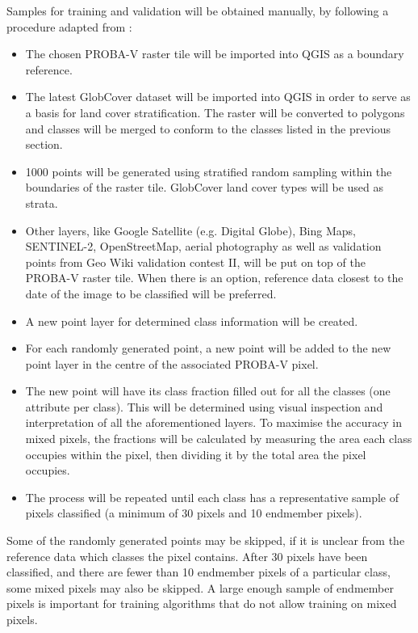 \documentclass[a4paper,10pt]{article}
\begin{document}
Samples for training and validation will be obtained manually, by following a procedure adapted from \cite{defries1998training}:
\begin{itemize}
 \item The chosen PROBA-V raster tile will be imported into QGIS as a boundary reference.
 \item The latest GlobCover dataset will be imported into QGIS in order to serve as a basis for land cover stratification. The raster will be converted to polygons and classes will be merged to conform to the classes listed in the previous section.
 \item 1000 points will be generated using stratified random sampling within the boundaries of the raster tile. GlobCover land cover types will be used as strata.
 \item Other layers, like Google Satellite (e.g. Digital Globe), Bing Maps, SENTINEL-2, OpenStreetMap, aerial photography as well as validation points from Geo Wiki validation contest II, will be put on top of the PROBA-V raster tile. When there is an option, reference data closest to the date of the image to be classified will be preferred.
 \item A new point layer for determined class information will be created.
 \item For each randomly generated point, a new point will be added to the new point layer in the centre of the associated PROBA-V pixel.
 \item The new point will have its class fraction filled out for all the classes (one attribute per class). This will be determined using visual inspection and interpretation of all the aforementioned layers. To maximise the accuracy in mixed pixels, the fractions will be calculated by measuring the area each class occupies within the pixel, then dividing it by the total area the pixel occupies.
 \item The process will be repeated until each class has a representative sample of pixels classified (a minimum of 30 pixels and 10 endmember pixels).
\end{itemize}

Some of the randomly generated points may be skipped, if it is unclear from the reference data which classes the pixel contains. After 30 pixels have been classified, and there are fewer than 10 endmember pixels of a particular class, some mixed pixels may also be skipped. A large enough sample of endmember pixels is important for training algorithms that do not allow training on mixed pixels.
\end{document}
